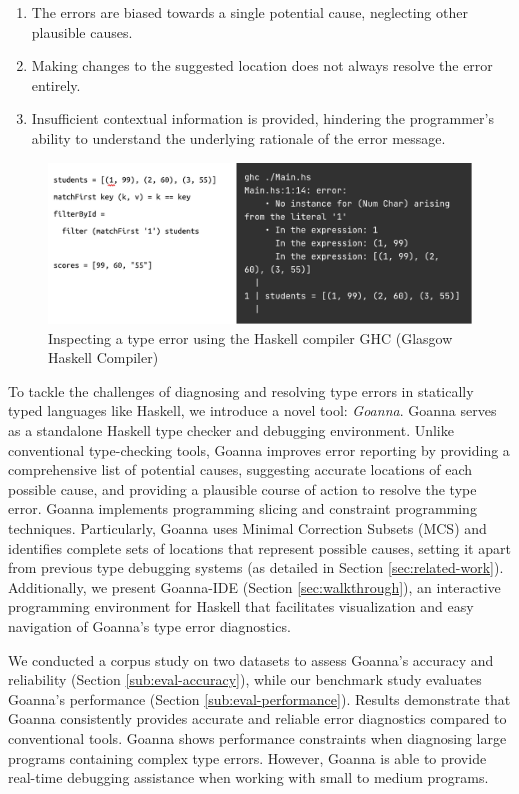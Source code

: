 \documentclass[pdflatex,lineno,sn-nature,Numbered]{sn-jnl}%
\begin{document}
\begin{enumerate}
    \item The errors are biased towards a single potential cause, neglecting other plausible causes.
    \item Making changes to the suggested location does not always resolve the error entirely.
    \item Insufficient contextual information is provided, hindering the programmer's ability to understand the underlying rationale of the error message.
\end{enumerate}


\begin{figure}[ht!]
    \centering
    \includegraphics[width=\linewidth]{images/motivation}
    \caption{Inspecting a type error using the Haskell compiler GHC (Glasgow Haskell Compiler)}
    \label{fig:motivation}
\end{figure}

To tackle the challenges of diagnosing and resolving type errors in statically typed languages like Haskell, we introduce a novel tool: \textit{Goanna}. Goanna serves as a standalone Haskell type checker and debugging environment. Unlike conventional type-checking tools, Goanna improves error reporting by providing a comprehensive list of potential causes, suggesting accurate locations of each possible cause, and providing a plausible course of action to resolve the type error. Goanna implements programming slicing and constraint programming techniques. Particularly, Goanna uses  Minimal Correction Subsets (MCS) and identifies complete sets of locations that represent possible causes, setting it apart from previous type debugging systems (as detailed in Section \ref{sec:related-work}).  Additionally, we present Goanna-IDE (Section \ref{sec:walkthrough}), an interactive programming environment for Haskell that facilitates visualization and easy navigation of Goanna's type error diagnostics.

We conducted a corpus study on two datasets to assess Goanna's accuracy and reliability (Section \ref{sub:eval-accuracy}), while our benchmark study evaluates Goanna's performance (Section \ref{sub:eval-performance}). Results demonstrate that Goanna consistently provides accurate and reliable error diagnostics compared to conventional tools. Goanna shows performance constraints when diagnosing large programs containing complex type errors. However, Goanna is able to provide real-time debugging assistance when working with small to medium programs.
\end{document}

